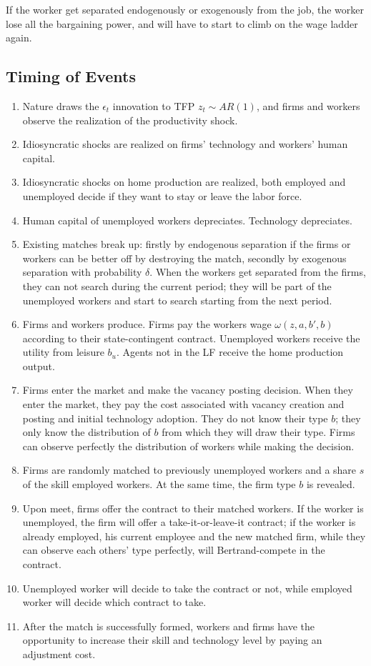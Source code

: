 \documentclass[12pt]{article}
\newcommand{\1}{\mathbb{1}}
\begin{document}
If the worker get separated endogenously or exogenously from the job, the worker lose all the bargaining power, and will have to start to climb on the wage ladder again. \\



\subsection{Timing of Events}
\begin{enumerate}
\item Nature draws the $\epsilon_t$ innovation to TFP $z_t \sim AR(1)$, and firms and workers observe the realization of the productivity shock. 
\item Idiosyncratic shocks are realized on firms' technology and workers' human capital. 
\item Idiosyncratic shocks on home production are realized, both employed and unemployed decide if they want to stay or leave the labor force.
\item Human capital of unemployed workers depreciates. Technology depreciates. 
\item Existing matches break up: firstly by endogenous separation if the firms or workers can be better off by destroying the match, secondly by exogenous separation with probability $\delta$. When the workers get separated from the firms, they can not search during the current period; they will be part of the unemployed workers and start to search starting from the next period. 
\item Firms and workers produce. Firms pay the workers wage $\omega(z,a,b',b)$ according to their state-contingent contract. Unemployed workers receive the utility from leisure $b_u$. Agents not in the LF receive the home production output. 
\item Firms enter the market and make the vacancy posting decision. When they enter the market, they pay the cost associated with vacancy creation and posting and initial technology adoption. They do not know their type $b$; they only know the distribution of $b$ from which they will draw their type. Firms can observe perfectly the distribution of workers while making the decision. 
\item Firms are randomly matched to previously unemployed workers and a share $s$ of the skill employed workers. At the same time, the firm type $b$ is revealed. 
\item Upon meet, firms offer the contract to their matched workers. If the worker is unemployed, the firm will offer a take-it-or-leave-it contract; if the worker is already employed, his current employee and the new matched firm, while they can observe each others' type perfectly, will Bertrand-compete in the contract. 
\item Unemployed worker will decide to take the contract or not, while employed worker will decide which contract to take. 
\item After the match is successfully formed, workers and firms have the opportunity to increase their skill and technology level by paying an adjustment cost. 
\end{enumerate}
\end{document}
